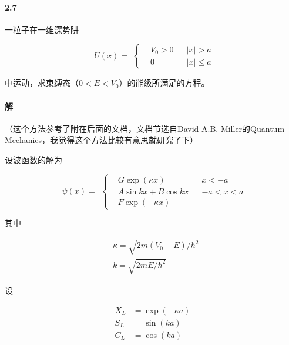 \documentclass{article}
\begin{document}
\paragraph{2.7}

一粒子在一维深势阱

\begin{equation*}
  \begin{aligned}
    U \left( x \right) =
  \end{aligned}
  \left\{
  \begin{aligned}
    & V_0 > 0 && \left| x \right| > a \\
    & 0 && \left| x \right| \leq a
  \end{aligned}
  \right.
\end{equation*}

中运动，求束缚态（$0<E<V_0$）的能级所满足的方程。

\paragraph{解}

（这个方法参考了附在后面的文档，文档节选自David A.B. Miller的Quantum Mechanics，我觉得这个方法比较有意思就研究了下）

设波函数的解为

\begin{equation*}
  \begin{aligned}
    \psi \left( x \right) =
  \end{aligned}
  \left\{
  \begin{aligned}
    & G \exp \left( \kappa x \right) && x<-a \\
    & A \sin kx + B \cos kx && -a < x < a \\
    & F \exp \left( - \kappa x \right)
  \end{aligned}
  \right.
\end{equation*}

其中

\begin{equation*}
  \begin{aligned}
    & \kappa = \sqrt{2m \left( V_0 - E \right) / \hbar^2} \\
    & k = \sqrt{2mE / \hbar^2}
  \end{aligned}
\end{equation*}

设

\begin{equation*}
  \begin{aligned}
    X_L &= \exp \left( - \kappa a \right) \\
    S_L &= \sin \left( k a \right) \\
    C_L &= \cos \left( k a \right)
  \end{aligned}
\end{equation*}
\end{document}
